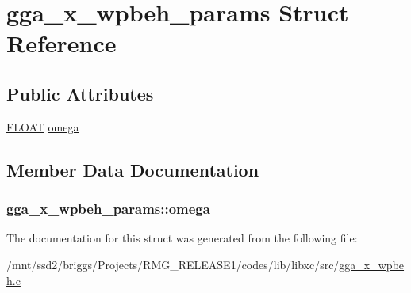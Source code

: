 \hypertarget{structgga__x__wpbeh__params}{\section{gga\-\_\-x\-\_\-wpbeh\-\_\-params Struct Reference}
\label{structgga__x__wpbeh__params}
}
\subsection*{Public Attributes}
\begin{DoxyCompactItemize}
\item 
\hyperlink{src_2xc__config_8h_ae8690abbffa85934d64d545920e2b108}{F\-L\-O\-A\-T} \hyperlink{structgga__x__wpbeh__params_a6b36f9577304ddad1161bd9b249ab47e}{omega}
\end{DoxyCompactItemize}


\subsection{Member Data Documentation}
\hypertarget{structgga__x__wpbeh__params_a6b36f9577304ddad1161bd9b249ab47e}{
\subsubsection[{omega}]{ gga\-\_\-x\-\_\-wpbeh\-\_\-params\-::omega}}\label{structgga__x__wpbeh__params_a6b36f9577304ddad1161bd9b249ab47e}


The documentation for this struct was generated from the following file\-:\begin{DoxyCompactItemize}
\item 
/mnt/ssd2/briggs/\-Projects/\-R\-M\-G\-\_\-\-R\-E\-L\-E\-A\-S\-E1/codes/lib/libxc/src/\hyperlink{gga__x__wpbeh_8c}{gga\-\_\-x\-\_\-wpbeh.\-c}\end{DoxyCompactItemize}
